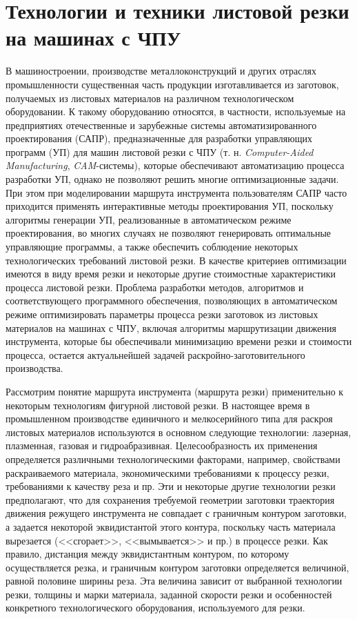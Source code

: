 \documentclass[11pt,twoside,openany]{report}
\begin{document}
\section{Технологии и техники листовой резки на машинах с ЧПУ}

В машиностроении,
производстве металлоконструкций
и других отраслях промышленности существенная часть продукции
изготавливается из заготовок,
получаемых из листовых материалов на различном технологическом оборудовании.
К такому оборудованию относятся, в частности,
используемые на предприятиях отечественные и зарубежные
системы автоматизированного проектирования (САПР),
предназначенные для разработки управляющих программ (УП)
для машин листовой резки с ЧПУ
(т. н. \textit{Computer-Aided Manufacturing},
\textit{CAM}-системы),
которые
обеспечивают автоматизацию процесса разработки УП,
однако не позволяют решить многие оптимизационные задачи.
При этом при моделировании маршрута инструмента пользователям
САПР часто приходится применять интерактивные методы проектирования УП,
поскольку алгоритмы генерации УП,
реализованные в автоматическом режиме проектирования,
во многих случаях не позволяют генерировать оптимальные управляющие программы,
а также обеспечить соблюдение некоторых технологических требований листовой резки.
В качестве критериев оптимизации имеются в виду время резки и
некоторые другие стоимостные характеристики процесса листовой резки.
Проблема разработки методов, алгоритмов и соответствующего программного обеспечения,
позволяющих в автоматическом режиме оптимизировать параметры
процесса резки заготовок из листовых материалов на машинах с ЧПУ,
включая алгоритмы маршрутизации движения инструмента,
которые бы обеспечивали минимизацию времени резки и стоимости процесса,
остается актуальнейшей задачей раскройно-заготовительного производства.

Рассмотрим понятие маршрута инструмента (маршрута резки)
применительно к некоторым технологиям фигурной листовой резки.
В настоящее время в промышленном производстве
единичного и мелкосерийного типа для раскроя листовых материалов
используются в основном следующие технологии:
лазерная, плазменная, газовая и гидроабразивная.
Целесообразность их применения определяется различными технологическими факторами,
например, свойствами раскраиваемого материала,
экономическими требованиями к процессу резки,
требованиями к качеству реза и пр.
Эти и некоторые другие технологии резки предполагают,
что для сохранения требуемой геометрии заготовки
траектория движения режущего инструмента не совпадает
с граничным контуром заготовки,
а задается некоторой эквидистантой этого контура,
поскольку часть материала вырезается (<<сгорает>>, <<вымывается>> и пр.)
в процессе резки.
Как правило, дистанция между эквидистантным контуром,
по которому осуществляется резка, и граничным контуром заготовки определяется величиной,
равной половине ширины реза.
Эта величина зависит от выбранной технологии резки,
толщины и марки материала, заданной скорости резки
и особенностей конкретного технологического оборудования,
используемого для резки.
\end{document}
